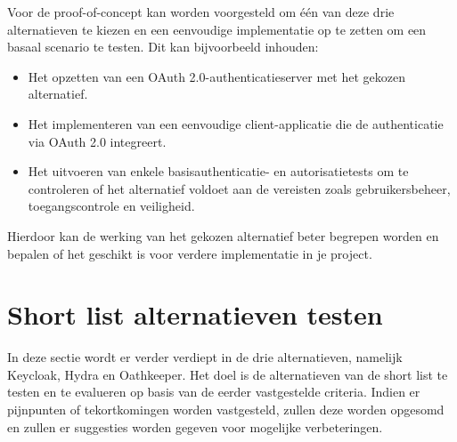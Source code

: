 Voor de proof-of-concept kan worden voorgesteld om één van deze drie alternatieven te kiezen en een eenvoudige implementatie op te zetten om een basaal scenario te testen. Dit kan bijvoorbeeld inhouden:

\begin{itemize}
    \item Het opzetten van een OAuth 2.0-authenticatieserver met het gekozen alternatief.
    \item Het implementeren van een eenvoudige client-applicatie die de authenticatie via OAuth 2.0 integreert.
    \item Het uitvoeren van enkele basisauthenticatie- en autorisatietests om te controleren of het alternatief voldoet aan de vereisten zoals gebruikersbeheer, toegangscontrole en veiligheid.
\end{itemize}

Hierdoor kan de werking van het gekozen alternatief beter begrepen worden en bepalen of het geschikt is voor verdere implementatie in je project.


\section{Short list alternatieven testen}
\label{sec:short-list-alternatieven-testen}
In deze sectie wordt er verder verdiept in de drie alternatieven, namelijk Keycloak, Hydra en Oathkeeper.
Het doel is de alternatieven van de short list te testen en te evalueren op basis van de eerder vastgestelde criteria. Indien er pijnpunten of tekortkomingen worden vastgesteld, zullen deze worden opgesomd en zullen er suggesties worden gegeven voor mogelijke verbeteringen.

